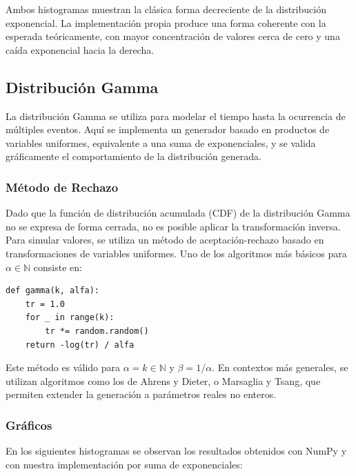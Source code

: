 \documentclass{article}
\begin{document}
Ambos histogramas muestran la clásica forma decreciente de la distribución exponencial. La implementación propia produce una forma coherente con la esperada teóricamente, con mayor concentración de valores cerca de cero y una caída exponencial hacia la derecha.



\subsection{Distribución Gamma}
La distribución Gamma se utiliza para modelar el tiempo hasta la ocurrencia de múltiples eventos. Aquí se implementa un generador basado en productos de variables uniformes, equivalente a una suma de exponenciales, y se valida gráficamente el comportamiento de la distribución generada.

\subsubsection{Método de Rechazo}
Dado que la función de distribución acumulada (CDF) de la distribución Gamma no se expresa de forma cerrada, no es posible aplicar la transformación inversa. Para simular valores, se utiliza un método de aceptación-rechazo basado en transformaciones de variables uniformes. Uno de los algoritmos más básicos para \( \alpha \in \mathbb{N} \) consiste en:

\begin{verbatim}
def gamma(k, alfa):
    tr = 1.0
    for _ in range(k):
        tr *= random.random()
    return -log(tr) / alfa
\end{verbatim}

Este método es válido para \( \alpha = k \in \mathbb{N} \) y \( \beta = 1/\alpha \). En contextos más generales, se utilizan algoritmos como los de Ahrens y Dieter, o Marsaglia y Tsang, que permiten extender la generación a parámetros reales no enteros.

\subsubsection{Gráficos}
En los siguientes histogramas se observan los resultados obtenidos con NumPy y con nuestra implementación por suma de exponenciales:
\end{document}
